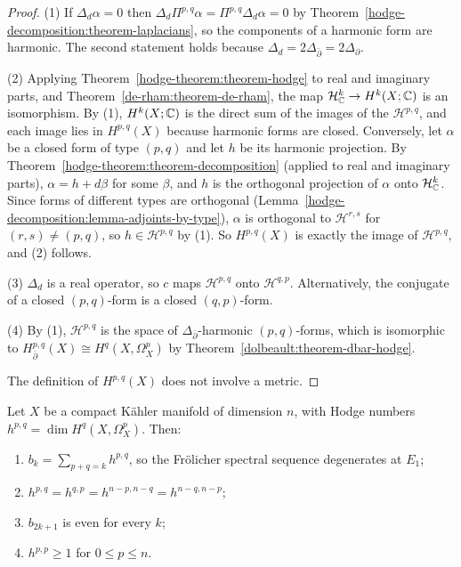 \begin{proof}
(1) If $\Delta_d\alpha = 0$ then $\Delta_d\Pi^{p,q}\alpha = \Pi^{p,q}\Delta_d\alpha = 0$ by
Theorem~\ref{hodge-decomposition:theorem-laplacians}, so the components of a harmonic form are harmonic. The second statement holds
because $\Delta_d = 2\Delta_{\bar\partial} = 2\Delta_\partial$.

(2) Applying Theorem~\ref{hodge-theorem:theorem-hodge} to real and imaginary parts, and Theorem~\ref{de-rham:theorem-de-rham}, the map
$\mathcal{H}^k_{\mathbb{C}} \to H^k(X; \mathbb{C})$ is an isomorphism. By (1), $H^k(X; \mathbb{C})$ is the direct sum of the images of the $\mathcal{H}^{p,q}$,
and each image lies in $H^{p,q}(X)$ because harmonic forms are closed. Conversely, let $\alpha$ be a closed form of type $(p,q)$ and let
$h$ be its harmonic projection. By Theorem~\ref{hodge-theorem:theorem-decomposition} (applied to real and imaginary parts),
$\alpha = h + d\beta$ for some $\beta$, and $h$ is the orthogonal projection of $\alpha$ onto $\mathcal{H}^k_{\mathbb{C}}$. Since forms of different
types are orthogonal (Lemma~\ref{hodge-decomposition:lemma-adjoints-by-type}), $\alpha$ is orthogonal to $\mathcal{H}^{r,s}$ for
$(r,s) \neq (p,q)$, so $h \in \mathcal{H}^{p,q}$ by (1). So $H^{p,q}(X)$ is exactly the image of $\mathcal{H}^{p,q}$, and (2) follows.

(3) $\Delta_d$ is a real operator, so $c$ maps $\mathcal{H}^{p,q}$ onto $\mathcal{H}^{q,p}$. Alternatively, the conjugate of a closed
$(p,q)$-form is a closed $(q,p)$-form.

(4) By (1), $\mathcal{H}^{p,q}$ is the space of $\Delta_{\bar\partial}$-harmonic $(p,q)$-forms, which is isomorphic to
$H^{p,q}_{\bar\partial}(X) \cong H^q(X, \Omega^p_X)$ by Theorem~\ref{dolbeault:theorem-dbar-hodge}.

The definition of $H^{p,q}(X)$ does not involve a metric.
\end{proof}

\begin{corollary}\label{hodge-decomposition:corollary-hodge-numbers}
Let $X$ be a compact K\"ahler manifold of dimension $n$, with Hodge numbers $h^{p,q} = \dim H^q(X, \Omega^p_X)$. Then:
\begin{enumerate}
\item $b_k = \sum_{p+q=k}h^{p,q}$, so the Fr\"olicher spectral sequence degenerates at $E_1$;
\item $h^{p,q} = h^{q,p} = h^{n-p,n-q} = h^{n-q,n-p}$;
\item $b_{2k+1}$ is even for every $k$;
\item $h^{p,p} \geq 1$ for $0 \leq p \leq n$.
\end{enumerate}
\end{corollary}

